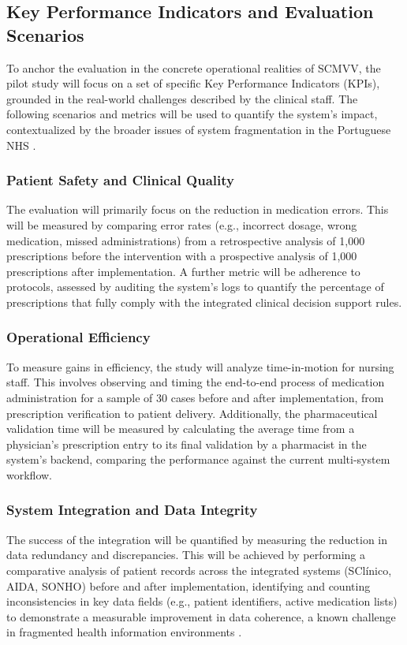 \subsection{Key Performance Indicators and Evaluation Scenarios}
\label{sec:KPIs}

To anchor the evaluation in the concrete operational realities of SCMVV, the pilot study will focus on a set of specific Key Performance Indicators (KPIs), grounded in the real-world challenges described by the clinical staff. The following scenarios and metrics will be used to quantify the system's impact, contextualized by the broader issues of system fragmentation in the Portuguese NHS \cite{goiana2024portuguese, nunes2021articulacao}.

\subsubsection{Patient Safety and Clinical Quality}
The evaluation will primarily focus on the reduction in medication errors. This will be measured by comparing error rates (e.g., incorrect dosage, wrong medication, missed administrations) from a retrospective analysis of 1,000 prescriptions before the intervention with a prospective analysis of 1,000 prescriptions after implementation. A further metric will be adherence to protocols, assessed by auditing the system's logs to quantify the percentage of prescriptions that fully comply with the integrated clinical decision support rules.

\subsubsection{Operational Efficiency}
To measure gains in efficiency, the study will analyze time-in-motion for nursing staff. This involves observing and timing the end-to-end process of medication administration for a sample of 30 cases before and after implementation, from prescription verification to patient delivery. Additionally, the pharmaceutical validation time will be measured by calculating the average time from a physician's prescription entry to its final validation by a pharmacist in the system's backend, comparing the performance against the current multi-system workflow.

\subsubsection{System Integration and Data Integrity}
The success of the integration will be quantified by measuring the reduction in data redundancy and discrepancies. This will be achieved by performing a comparative analysis of patient records across the integrated systems (SClínico, AIDA, SONHO) before and after implementation, identifying and counting inconsistencies in key data fields (e.g., patient identifiers, active medication lists) to demonstrate a measurable improvement in data coherence, a known challenge in fragmented health information environments \cite{pinto2016identification}. 